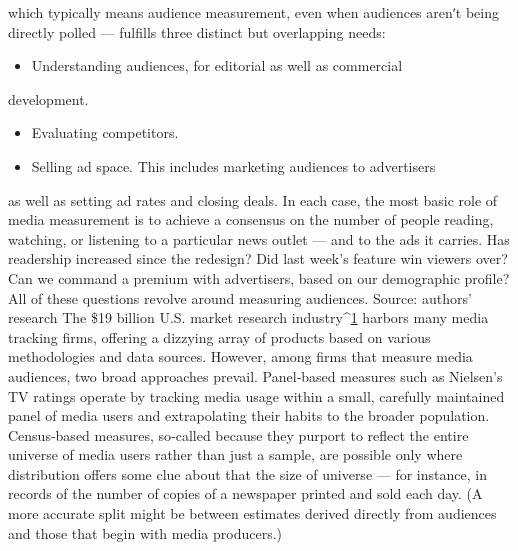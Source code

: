 which typically means audience measurement, even when audiences
arenʹt being directly polled — fulfills three distinct but overlapping needs:
\begin{itemize}
\item Understanding audiences, for editorial as well as commercial
\end{itemize}
development.
\begin{itemize}
\item Evaluating competitors.
\item Selling ad space. This includes marketing audiences to advertisers
\end{itemize}
as well as setting ad rates and closing deals.
In each case, the most basic role of media measurement is to achieve a
consensus on the number of people reading, watching, or listening to a
particular news outlet — and to the ads it carries. Has readership
increased since the redesign? Did last week’s feature win viewers over?
Can we command a premium with advertisers, based on our demographic
profile? All of these questions revolve around measuring audiences.
Source: authors’ research
The \$19 billion U.S. market research industry^{\href{#endnotes}{1}} harbors many media
tracking firms, offering a dizzying array of products based on various
methodologies and data sources. However, among firms that measure
media audiences, two broad approaches prevail. Panel‐based measures
such as Nielsen’s TV ratings operate by tracking media usage within a
small, carefully maintained panel of media users and extrapolating their
habits to the broader population. Census‐based measures, so‐called
because they purport to reflect the entire universe of media users rather
than just a sample, are possible only where distribution offers some clue
about that the size of universe — for instance, in records of the number of
copies of a newspaper printed and sold each day. (A more accurate split
might be between estimates derived directly from audiences and those
that begin with media producers.)


